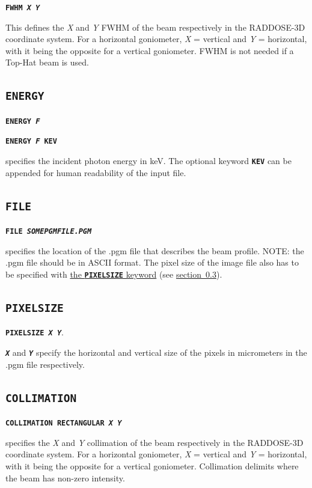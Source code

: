 \documentclass[a4paper]{article}
\newcommand{\Keyword}[1]{\texttt{\textbf{#1}}\xspace}
\newcommand{\SB}{\\[0.2em]}
\begin{document}
\label{beamfwhm}
\noindent \Keyword{FWHM \textit{X Y}}

This defines the \textit{X} and \textit{Y} FWHM of the beam respectively in the RADDOSE-3D coordinate system. 
For a horizontal goniometer, \textit{X} = vertical and \textit{Y} = horizontal, with it being the opposite for a vertical goniometer. FWHM is not needed if a Top-Hat beam is used.


\subsection{\Keyword{ENERGY}}

\noindent \Keyword{ENERGY \textit{F}}

\noindent \Keyword{ENERGY \textit{F} KEV}

specifies the incident photon energy in keV. The optional keyword \Keyword{KEV} can be appended for human readability of the input file.

\subsection{\Keyword{FILE}}
\label{file}

\noindent \Keyword{FILE \textit{SOMEPGMFILE.PGM}}

specifies the location of the .pgm file that describes the beam profile. NOTE: the .pgm file should be in ASCII format. The pixel size of the image file also has to be specified with \hyperref[pixelsize]{the \Keyword{PIXELSIZE} keyword} (see \hyperref[pixelsize]{section~\ref*{pixelsize}}).\SB

\subsection{\Keyword{PIXELSIZE}}
\label{pixelsize}

\noindent \Keyword{PIXELSIZE \textit{X Y}}.

\Keyword{\textit{X}} and \Keyword{\textit{Y}} specify the horizontal and vertical size of the pixels in micrometers in the .pgm file respectively.

\subsection{\Keyword{COLLIMATION}}

\noindent \Keyword{COLLIMATION RECTANGULAR \textit{X Y}}

specifies the \textit{X} and \textit{Y} collimation of the beam respectively in the RADDOSE-3D coordinate system. 
For a horizontal goniometer, \textit{X} = vertical and \textit{Y} = horizontal, with it being the opposite for a vertical goniometer.  Collimation delimits where the beam has non-zero intensity.
\end{document}
